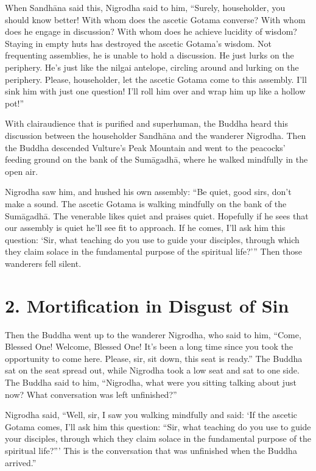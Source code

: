 \documentclass[12pt,openany]{book}%
\begin{document}
When \textsanskrit{Sandhāna} said this, Nigrodha said to him, “Surely, householder, you should know better! With whom does the ascetic Gotama converse? With whom does he engage in discussion? With whom does he achieve lucidity of wisdom? Staying in empty huts has destroyed the ascetic Gotama’s wisdom. Not frequenting assemblies, he is unable to hold a discussion. He just lurks on the periphery. He’s just like the nilgai antelope, circling around and lurking on the periphery. Please, householder, let the ascetic Gotama come to this assembly. I’ll sink him with just one question! I’ll roll him over and wrap him up like a hollow pot!” 

With clairaudience that is purified and superhuman, the Buddha heard this discussion between the householder \textsanskrit{Sandhāna} and the wanderer Nigrodha. Then the Buddha descended Vulture’s Peak Mountain and went to the peacocks’ feeding ground on the bank of the \textsanskrit{Sumāgadhā}, where he walked mindfully in the open air. 

Nigrodha saw him, and hushed his own assembly: “Be quiet, good sirs, don’t make a sound. The ascetic Gotama is walking mindfully on the bank of the \textsanskrit{Sumāgadhā}. The venerable likes quiet and praises quiet. Hopefully if he sees that our assembly is quiet he’ll see fit to approach. If he comes, I’ll ask him this question: ‘Sir, what teaching do you use to guide your disciples, through which they claim solace in the fundamental purpose of the spiritual life?’” Then those wanderers fell silent. 

\section*{2. Mortification in Disgust of Sin }

Then the Buddha went up to the wanderer Nigrodha, who said to him, “Come, Blessed One! Welcome, Blessed One! It’s been a long time since you took the opportunity to come here. Please, sir, sit down, this seat is ready.” The Buddha sat on the seat spread out, while Nigrodha took a low seat and sat to one side. The Buddha said to him, “Nigrodha, what were you sitting talking about just now? What conversation was left unfinished?” 

Nigrodha said, “Well, sir, I saw you walking mindfully and said: ‘If the ascetic Gotama comes, I’ll ask him this question: “Sir, what teaching do you use to guide your disciples, through which they claim solace in the fundamental purpose of the spiritual life?”’ This is the conversation that was unfinished when the Buddha arrived.” 
\end{document}
